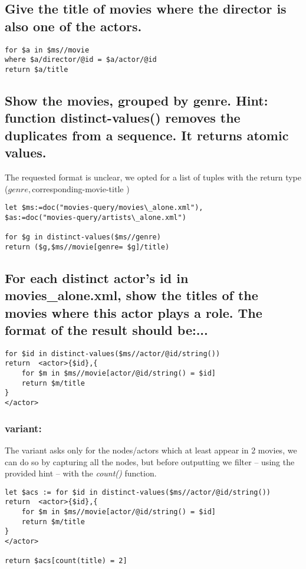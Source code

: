 \documentclass{article}
\begin{document}
\subsection{ Give the title of movies where the director is also one
  of the actors.}
\begin{verbatim}
for $a in $ms//movie
where $a/director/@id = $a/actor/@id
return $a/title
\end{verbatim}
\subsection{ Show the movies, grouped by genre. Hint: function
  distinct-values() removes the duplicates from a sequence. It returns
  atomic values.}
The requested format is unclear, we opted for a list of tuples with
the return type ($genre, $corresponding-movie-title )
\begin{verbatim}
let $ms:=doc("movies-query/movies\_alone.xml"),                                                                                           
$as:=doc("movies-query/artists\_alone.xml")

for $g in distinct-values($ms//genre)
return ($g,$ms//movie[genre= $g]/title)
\end{verbatim}

\subsection{ For each distinct actor's id in movies\_alone.xml, show
  the titles of the movies where this actor plays a role. The format
  of the result should be:...}
\begin{verbatim}
for $id in distinct-values($ms//actor/@id/string())
return  <actor>{$id},{
    for $m in $ms//movie[actor/@id/string() = $id]
    return $m/title
}
</actor>
\end{verbatim}

\subsubsection{variant:}
The variant asks only for the nodes/actors which at least appear in 2
movies, we can do so by capturing all the nodes, but before outputting
we filter -- using the provided hint -- with the \emph{count()}
function.

\begin{verbatim}
let $acs := for $id in distinct-values($ms//actor/@id/string())
return  <actor>{$id},{
    for $m in $ms//movie[actor/@id/string() = $id]
    return $m/title
}
</actor>

return $acs[count(title) = 2]
\end{verbatim}
\end{document}
